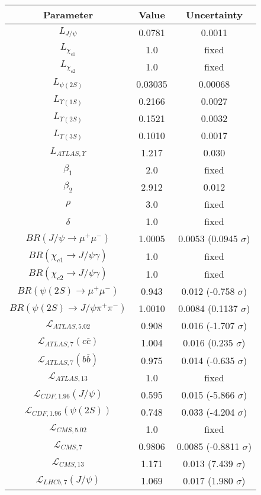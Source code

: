 \begin{table}[h!]
\centering
\begin{tabular}{c|c|c}
Parameter & Value & Uncertainty \\
\hline
$L_{J/\psi}$ & 0.0781 & 0.0011 \\
$L_{\chi_{c1}}$ & 1.0 & fixed \\
$L_{\chi_{c2}}$ & 1.0 & fixed \\
$L_{\psi(2S)}$ & 0.03035 & 0.00068 \\
$L_{\Upsilon(1S)}$ & 0.2166 & 0.0027 \\
$L_{\Upsilon(2S)}$ & 0.1521 & 0.0032 \\
$L_{\Upsilon(3S)}$ & 0.1010 & 0.0017 \\
$L_{ATLAS,\Upsilon}$ & 1.217 & 0.030 \\
$\beta_1$ & 2.0 & fixed \\
$\beta_2$ & 2.912 & 0.012 \\
$\rho$ & 3.0 & fixed \\
$\delta$ & 1.0 & fixed \\
$BR(J/\psi\rightarrow\mu^+\mu^-)$ & 1.0005 & 0.0053 (0.0945 $\sigma$) \\
$BR(\chi_{c1}\rightarrow J/\psi\gamma)$ & 1.0 & fixed \\
$BR(\chi_{c2}\rightarrow J/\psi\gamma)$ & 1.0 & fixed \\
$BR(\psi(2S)\rightarrow\mu^+\mu^-)$ & 0.943 & 0.012 (-0.758 $\sigma$) \\
$BR(\psi(2S)\rightarrow J/\psi\pi^+\pi^-)$ & 1.0010 & 0.0084 (0.1137 $\sigma$) \\
$\mathcal L_{ATLAS,5.02}$ & 0.908 & 0.016 (-1.707 $\sigma$) \\
$\mathcal L_{ATLAS,7}(c\overline c)$ & 1.004 & 0.016 (0.235 $\sigma$) \\
$\mathcal L_{ATLAS,7}(b\overline b)$ & 0.975 & 0.014 (-0.635 $\sigma$) \\
$\mathcal L_{ATLAS,13}$ & 1.0 & fixed \\
$\mathcal L_{CDF,1.96}(J/\psi)$ & 0.595 & 0.015 (-5.866 $\sigma$) \\
$\mathcal L_{CDF,1.96}(\psi(2S))$ & 0.748 & 0.033 (-4.204 $\sigma$) \\
$\mathcal L_{CMS,5.02}$ & 1.0 & fixed \\
$\mathcal L_{CMS,7}$ & 0.9806 & 0.0085 (-0.8811 $\sigma$) \\
$\mathcal L_{CMS,13}$ & 1.171 & 0.013 (7.439 $\sigma$) \\
$\mathcal L_{LHCb,7}(J/\psi)$ & 1.069 & 0.017 (1.980 $\sigma$) \\

\end{tabular}
\end{table}
